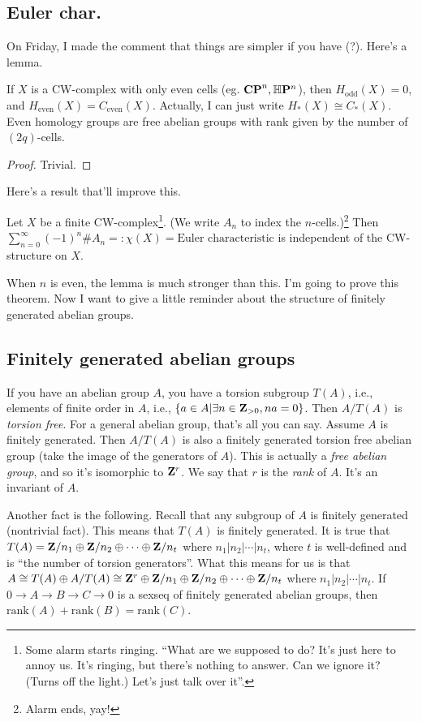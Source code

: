 \subsection{Euler char.}
On Friday, I made the comment that things are simpler if you have (?). Here's a lemma.
\begin{lemma}
If $X$ is a CW-complex with only even cells (eg. $\mathbf{CP}^n,\mathbb{H}\mathbf{P}^n$), then $ H_\text{odd}(X)=0$, and $ H_\text{even}(X)=C_\text{even}(X)$. Actually, I can just write $ H_\ast(X)\cong C_\ast(X)$. Even homology groups are free abelian groups with rank given by the number of $(2q)$-cells.
\end{lemma}
\begin{proof}
Trivial.
\end{proof}
Here's a result that'll improve this.
\begin{theorem}
Let $X$ be a finite CW-complex\footnote{Some alarm starts ringing. ``What are we supposed to do? It's just here to annoy us. It's ringing, but there's nothing to answer. Can we ignore it? (Turns off the light.) Let's just talk over it''.}. (We write $A_n$ to index the $n$-cells.)\footnote{Alarm ends, yay!} Then $\sum^\infty_{n=0}(-1)^n\# A_n=:\chi(X)=\text{Euler characteristic}$ is independent of the CW-structure on $X$. 
\end{theorem}
When $n$ is even, the lemma is much stronger than this. I'm going to prove this theorem. Now I want to give a little reminder about the structure of finitely generated abelian groups.
\subsection{Finitely generated abelian groups}
If you have an abelian group $A$, you have a torsion subgroup $T(A)$, i.e., elements of finite order in $A$, i.e., $\{a\in A|\exists n\in \mathbf Z_{>0},na=0\}$. Then $A/T(A)$ is \emph{torsion free}. For a general abelian group, that's all you can say. Assume $A$ is finitely generated. Then $A/T(A)$ is also a finitely generated torsion free abelian group (take the image of the generators of $A$). This is actually a \emph{free abelian group}, and so it's isomorphic to $\mathbf Z^r$. We say that $r$ is the \emph{rank} of $A$. It's an invariant of $A$.

Another fact is the following. Recall that any subgroup of $A$ is finitely generated (nontrivial fact). This means that $T(A)$ is finitely generated. It is true that $T(A)=\mathbf Z/n_1\oplus\mathbf Z/n_2\oplus\cdots\oplus\mathbf Z/n_t$ where $n_1|n_2|\cdots|n_t$, where $t$ is well-defined and is ``the number of torsion generators''. What this means for us is that $A\cong T(A)\oplus A/T(A)\cong \mathbf Z^r\oplus\mathbf Z/n_1\oplus\mathbf Z/n_2\oplus\cdots\oplus\mathbf Z/n_t$ where $n_1|n_2|\cdots|n_t$. If $0\to A\to B\to C\to 0$ is a sexseq of finitely generated abelian groups, then $\text{rank}(A)+\text{rank}(B)=\text{rank}(C)$.
